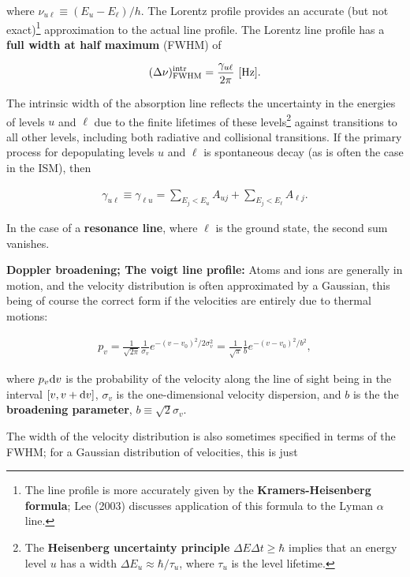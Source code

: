 \documentclass[a4paper,10pt]{article}
\begin{document}
{\noindent}where $\nu_{u\ell} \equiv (E_u-E_\ell)/h$. The Lorentz profile provides an accurate (but not exact)\footnote{The line profile is more accurately given by the \textbf{Kramers-Heisenberg formula}; Lee (2003) discusses application of this formula to the Lyman $\alpha$ line.} approximation to the actual line profile. The Lorentz line profile has a \textbf{full width at half maximum} (FWHM) of

\begin{align*}
    (\Delta\nu)_{\rm FWHM}^{\rm intr} = \frac{\gamma_{u\ell}}{2\pi} ~ [{\rm Hz}].
\end{align*}

{\noindent}The intrinsic width of the absorption line reflects the uncertainty in the energies of levels $u$ and $\ell$ due to the finite lifetimes of these levels\footnote{The \textbf{Heisenberg uncertainty principle} $\Delta E\Delta t\geq\hbar$ implies that an energy level $u$ has a width $\Delta E_u\approx\hbar/\tau_u$, where $\tau_u$ is the level lifetime.} against transitions to all other levels, including both radiative and collisional transitions. If the primary process for depopulating levels $u$ and $\ell$ is spontaneous decay (as is often the case in the ISM), then

\begin{align*}
    \gamma_{u\ell} \equiv \gamma_{\ell u} = \sum_{E_j<E_u}A_{uj} + \sum_{E_j<E_\ell}A_{\ell j}.
\end{align*}

{\noindent}In the case of a \textbf{resonance line}, where $\ell$ is the ground state, the second sum vanishes.

{\noindent}\textbf{Doppler broadening; The voigt line profile:} Atoms and ions are generally in motion, and the velocity distribution is often approximated by a Gaussian, this being of course the correct form if the velocities are entirely due to thermal motions:

\begin{align*}
    p_v = \frac{1}{\sqrt{2\pi}}\frac{1}{\sigma_v} e^{-(v-v_0)^2/2\sigma_v^2} = \frac{1}{\sqrt{\pi}}\frac{1}{b} e^{-(v-v_0)^2/b^2},
\end{align*}

{\noindent}where $p_v{\rm d}v$ is the probability of the velocity along the line of sight being in the interval $[v,v+{\rm d}v]$, $\sigma_v$ is the one-dimensional velocity dispersion, and $b$ is the the \textbf{broadening parameter}, $b\equiv\sqrt{2}\sigma_v$.

{\noindent}The width of the velocity distribution is also sometimes specified in terms of the FWHM; for a Gaussian distribution of velocities, this is just
\end{document}
